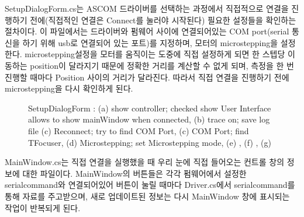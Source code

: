SetupDialogForm.cs는 ASCOM 드라이버를 선택하는 과정에서 직접적으로 연결을 진행하기 전에(직접적인 연결은 Connect를 눌러야 시작된다) 필요한 설정들을 확인하는 절차이다. 이 파일에서는 드라이버와 펌웨어 사이에 연결되어있는 COM port(serial 통신을 하기 위해 usb로 연결되어 있는 포트)를 지정하며, 모터의 microstepping을 설정한다. microstepping설정을 모터를 움직이는 도중에 직접 설정하게 되면 한 스텝당 이동하는 position이 달라지기 때문에 정확한 거리를 계산할 수 없게 되며, 측정을 한 번 진행할 때마다 Position 사이의 거리가 달라진다. 따라서 직접 연결을 진행하기 전에 microstepping을 다시 확인하게 된다.

\begin{figure}[h]
	\begin{center}
	\end{center}
	\caption{SetupDialogForm : (a) show controller; checked show User Interface allows to show mainWindow when connected, (b) trace on; save log file (c) Reconnect; try to find COM Port, (c) COM Port; find TFocuser, (d) Microstepping; set Microstepping mode, (e) , (f) , (g) }
	\label{fig:setupdialogform_capture}	
\end{figure}



MainWindow.cs는 직접 연결을 실행했을 때 우리 눈에 직접 들어오는 컨트롤 창의 정보에 대한 파일이다. MainWindow의 버튼들은 각각 펌웨어에서 설정한 serialcommand와 연결되어있어 버튼이 눌릴 때마다 Driver.cs에서 serialcommand를 통해 자료를 주고받으며, 새로 업데이트된 정보는 다시 MainWindow 창에 표시되는 작업이 반복되게 된다. 

